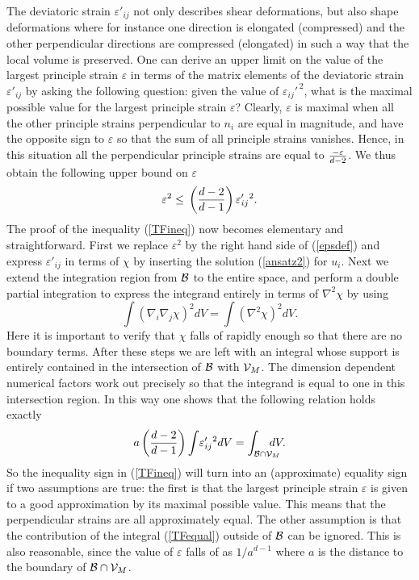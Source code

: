 \documentclass[a4paper,12pt]{article}
\newcommand{\be}{\begin{equation}}
\newcommand{\ee}{\end{equation}}
\begin{document}
The deviatoric strain $\varepsilon'_{ij}$ not only 
describes shear deformations,  but also shape deformations where for instance one direction is 
elongated (compressed) and the other perpendicular directions are compressed (elongated) in 
such a way that the local volume is preserved.  One can derive an upper limit on the value of the largest principle strain $\varepsilon$ in terms of 
the matrix elements of the deviatoric strain $\varepsilon'_{ij}$ by asking the following question: 
given the value of $\varepsilon_{ij}'^{\, 2}$, what is the maximal possible value for the largest 
principle strain $\varepsilon$?  Clearly, $\varepsilon$ is maximal when all the other  principle 
strains perpendicular to $n_i$ are equal in magnitude, and have the opposite sign to $\varepsilon$ so that the sum of all principle strains vanishes.  Hence, in this situation  all the perpendicular principle strains are equal to $
{-\varepsilon\over d-2}$. We thus obtain the following upper bound on  $\varepsilon$
\be
\label{epsdef}
\varepsilon^{2}\leq \, \left({d-2\over d-1}\right) \varepsilon'_{ij}{}^2 .
\ee 
The proof of the inequality (\ref{TFineq}) now becomes elementary and straightforward. First we replace $\varepsilon^2$ by the right hand side of (\ref{epsdef}) and express $\varepsilon'_{ij}$  in terms of $\chi$ by inserting the solution (\ref{ansatz2}) for $u_i$. Next we extend the integration region from $\cal B$ to the entire space, and perform a double partial integration to express the integrand entirely in terms of $\nabla^2\chi$ by using 
\begin{equation}
\int \!\left(\nabla_i\nabla_j\chi\right)^2 \!dV = \int \!\left(\nabla^2\chi\right)^2\! dV. 
\end{equation}
Here it is important to verify that $\chi$ falls of rapidly enough so that there are no boundary terms.  After these steps we are left with an integral whose support is entirely contained in the intersection of $\cal B$ with ${\cal V}_M$. The dimension dependent numerical factors work out precisely so that the integrand is equal to one in this intersection region. In this way one shows that the following relation holds exactly
\begin{equation}
\label{TFequal}a
\left({d-2\over d-1}\right)  \int\! \varepsilon'_{ij}{}^2	dV = \int_{{\cal B}\cap {\cal V}_M} \!\!\!\!\!\!\! dV. 
\end{equation}
So the inequality sign in (\ref{TFineq}) will turn into an (approximate) equality sign if two assumptions are true: the first is that the largest principle strain $\varepsilon$ is given to a good approximation by its maximal possible value. This means that the perpendicular strains are all approximately equal. The other assumption is that the contribution of the integral (\ref{TFequal}) outside of $\cal B$ can be ignored.  This is also reasonable, since the value of $\varepsilon$ falls of as $1/a^{d-1}$ where $a$ is the distance to the boundary of ${\cal B}\cap {\cal V}_M$.  
\end{document}

